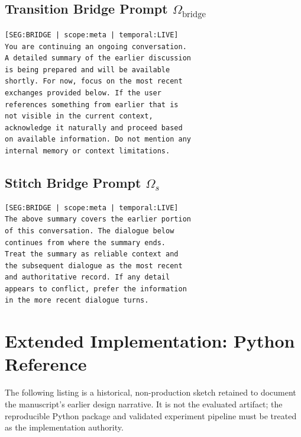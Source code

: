 \documentclass[10pt,twocolumn]{article}
\begin{document}
\subsection{Transition Bridge Prompt $\Omega_{\mathrm{bridge}}$}

\begin{lstlisting}[language={},basicstyle=\ttfamily\scriptsize]
[SEG:BRIDGE | scope:meta | temporal:LIVE]
You are continuing an ongoing conversation.
A detailed summary of the earlier discussion
is being prepared and will be available
shortly. For now, focus on the most recent
exchanges provided below. If the user
references something from earlier that is
not visible in the current context,
acknowledge it naturally and proceed based
on available information. Do not mention any
internal memory or context limitations.
\end{lstlisting}

\subsection{Stitch Bridge Prompt $\Omega_{s}$}

\begin{lstlisting}[language={},basicstyle=\ttfamily\scriptsize]
[SEG:BRIDGE | scope:meta | temporal:LIVE]
The above summary covers the earlier portion
of this conversation. The dialogue below
continues from where the summary ends.
Treat the summary as reliable context and
the subsequent dialogue as the most recent
and authoritative record. If any detail
appears to conflict, prefer the information
in the more recent dialogue turns.
\end{lstlisting}


\section{Extended Implementation: Python Reference}\label{app:code}

The following listing is a historical, non-production sketch retained to document the manuscript's earlier design narrative. It is not the evaluated artifact; the reproducible Python package and validated experiment pipeline must be treated as the implementation authority.
\end{document}
